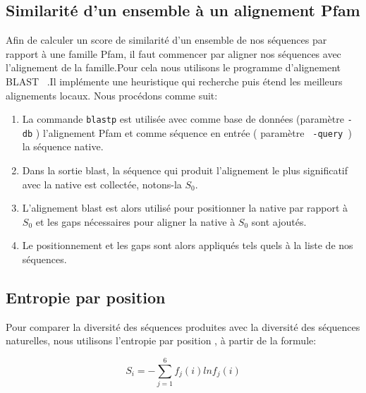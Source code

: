 \begin{enumerate}
\subsection{Similarité d'un ensemble à un alignement Pfam}
\label{SimPfam}
Afin de calculer un score de similarité d'un ensemble de nos séquences par rapport à une famille Pfam, il faut commencer par aligner nos séquences avec l'alignement de la famille.Pour cela nous utilisons le programme d'alignement BLAST ~\citep{refBLAST}.Il implémente une heuristique qui recherche puis étend les meilleurs alignements locaux. Nous procédons comme suit:
\begin{enumerate}
\item La commande \verb!blastp! est utilisée avec comme base de données (paramètre \verb!-db! ) l'alignement Pfam et comme séquence en entrée ( paramètre \verb! -query !) la séquence native. 
\item Dans la sortie blast, la séquence qui produit l'alignement le plus significatif avec la native est collectée, notons-la $S_0$. 
\item L'alignement blast est alors utilisé pour positionner la native par rapport à $S_0$ et les gaps nécessaires pour aligner la native à $S_0$ sont ajoutés.
\item Le positionnement et les gaps sont alors appliqués tels quels à la liste de nos séquences.

\end{enumerate}

\subsection{Entropie par position}
\label{subsection:Entropie}
Pour comparer la diversité des séquences produites avec la diversité des séquences naturelles, nous utilisons l'entropie par position \cite{DurbinBK}, à partir de la formule:

\begin{equation} \label{eq:entropy}
  S_i = - \sum_{j=1}^6 f_j(i)lnf_j(i)
\end{equation} 



\end{enumerate}
